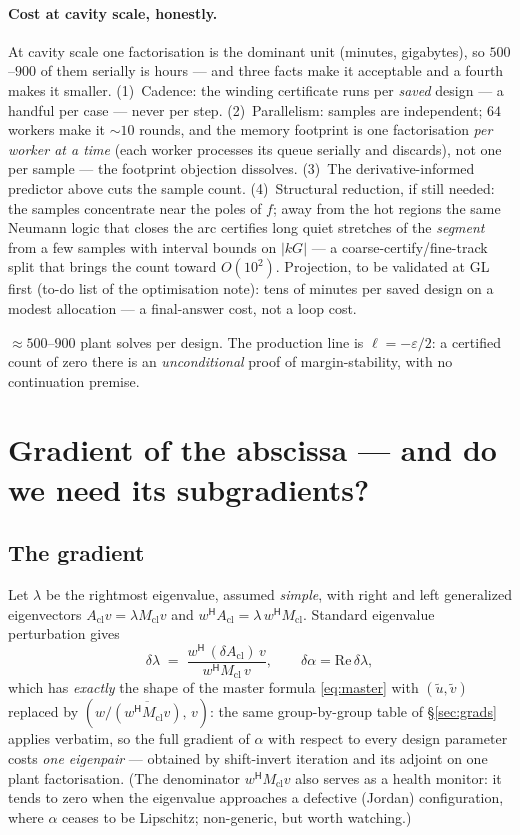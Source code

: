 \documentclass[11pt,a4paper]{article}
\newcommand{\eps}{\varepsilon}
\newcommand{\Mcl}{M_{\mathrm{cl}}}
\newcommand{\Acl}{A_{\mathrm{cl}}}
\newcommand{\hp}{^{\mathsf H}}
\begin{document}
{\paragraph{Cost at cavity scale, honestly.}
At cavity scale one factorisation is the dominant unit
(minutes, gigabytes), so $500$--$900$ of them serially is hours --- and
three facts make it acceptable and a fourth makes it smaller.  (1)~Cadence: the winding
certificate runs per \emph{saved} design --- a handful per case --- never per step.
(2)~Parallelism: samples are independent; $64$ workers make it $\sim10$ rounds, and the
memory footprint is one factorisation \emph{per worker at a time} (each worker processes
its queue serially and discards), not one per sample --- the footprint objection
dissolves.  (3)~The derivative-informed predictor above cuts the sample count.
(4)~Structural reduction, if still needed: the samples concentrate near the poles of $f$;
away from the hot regions the same Neumann logic that closes the arc certifies long
quiet stretches of the \emph{segment} from a few samples with interval bounds on
$|kG|$ --- a coarse-certify/fine-track split that brings the count toward $O(10^2)$.
Projection, to be validated at GL first (to-do list of the optimisation note): tens of
minutes per saved design on a modest allocation --- a final-answer cost, not a loop
cost.




$\approx500$--$900$ plant solves per design.  The production line is $\ell=-\eps/2$: a
certified count of zero there is an \emph{unconditional} proof of margin-stability, with
no continuation premise.

\section{Gradient of the abscissa --- and do we need its subgradients?}
\label{sec:subgrad}

\subsection{The gradient}
Let $\lambda$ be the rightmost eigenvalue, assumed \emph{simple}, with right and left
generalized eigenvectors
$\Acl v=\lambda \Mcl v$ and $w\hp\Acl=\lambda\,w\hp\Mcl$.  Standard eigenvalue
perturbation gives
\begin{equation}
\boxed{\;
\delta\lambda \;=\; \frac{w\hp\,(\delta\Acl)\,v}{\,w\hp \Mcl\, v\,},
\qquad
\delta\alpha=\mathrm{Re}\,\delta\lambda ,
\;}
\label{eq:alphagrad}
\end{equation}
which has \emph{exactly} the shape of the master formula \eqref{eq:master} with
$(\tilde u,\tilde v)$ replaced by $(w/\overline{(w\hp\Mcl v)},\,v)$: the same
group-by-group table of \S\ref{sec:grads} applies verbatim, so the full gradient of
$\alpha$ with respect to every design parameter costs \emph{one eigenpair} --- obtained by
shift-invert iteration and its adjoint on one plant factorisation.  (The denominator
$w\hp\Mcl v$ also serves as a health monitor: it tends to zero when the eigenvalue
approaches a defective (Jordan) configuration, where $\alpha$ ceases to be Lipschitz;
non-generic, but worth watching.)

}
\end{document}
